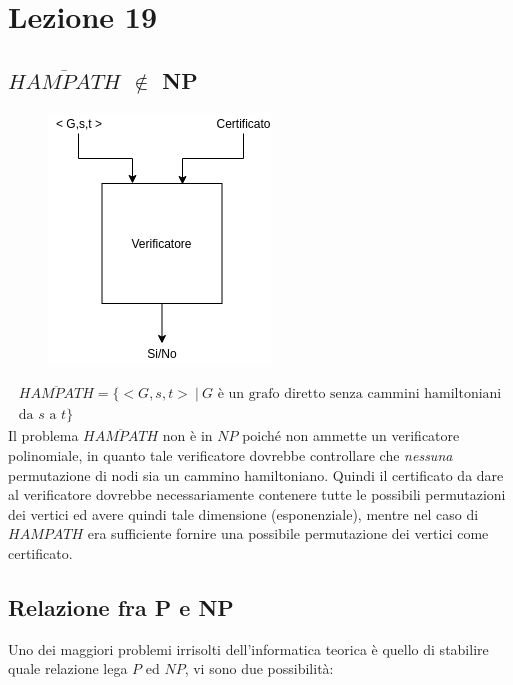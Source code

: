 
\newpage

\section{Lezione 19}

\subsection{\texorpdfstring{$\overline{HAMPATH}$}{HAMPATH negato} \texorpdfstring{$\notin$}{non appartiene a} NP}

\begin{figure}[H]
    \centering
    \includegraphics[scale=0.60]{notHam}
\end{figure}

\begin{gather*}
	\overline{HAMPATH} = \{ <G, s, t> \ | \ G \text{ è un grafo diretto senza cammini hamiltoniani} \\
	\text{da } s \text{ a } t \}
\end{gather*}
Il problema $\overline{HAMPATH}$ non è in $NP$ poiché non ammette un verificatore polinomiale, in quanto tale verificatore dovrebbe controllare che \textit{nessuna} permutazione di nodi sia un cammino hamiltoniano. Quindi il certificato da dare al verificatore dovrebbe necessariamente contenere tutte le possibili permutazioni dei vertici ed avere quindi tale dimensione (esponenziale), mentre nel caso di $HAMPATH$ era sufficiente fornire una possibile permutazione dei vertici come certificato.

\subsection{Relazione fra P e NP}

Uno dei maggiori problemi irrisolti dell'informatica teorica è quello di stabilire quale relazione lega $P$ ed $NP$, vi sono due possibilità:


